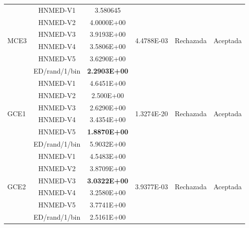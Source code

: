 \begin{table}
{\begin{tabular}{lccccc}
			\multirow{6}{*}{MCE3} & HNMED-V1      &  3.580645        & \multirow{6}{*}{4.4788E-03}  & \multirow{6}{*}{Rechazada}& \multirow{6}{*}{Aceptada} \\
			& HNMED-V2      & 4.0000E+00        &                    &                          &                            \\
			& HNMED-V3      & 3.9193E+00         &                    &                          &                            \\
			& HNMED-V4      & 3.5806E+00         &                    &                          &                            \\
			& HNMED-V5      &  3.6290E+00         &                    &                          &                            \\
			& ED/rand/1/bin & \textbf{2.2903E+00}    &                    &                          &                            \\
			
			
			
			\hline  
			\multirow{6}{*}{GCE1} & HNMED-V1      &   4.6451E+00       & \multirow{6}{*}{1.3274E-20}  & \multirow{6}{*}{Rechazada}& \multirow{6}{*}{Aceptada} \\
			& HNMED-V2      &   2.500E+00       &                    &                          &                            \\
			& HNMED-V3      &   2.6290E+00       &                    &                          &                            \\
			& HNMED-V4      &   3.4354E+00       &                    &                          &                            \\
			& HNMED-V5      &\textbf{1.8870E+00} &                    &                          &                            \\
			& ED/rand/1/bin &   5.9032E+00       &                    &                          &                            \\
			\hline  
			
			\multirow{6}{*}{GCE2} & HNMED-V1      &  4.5483E+00        & \multirow{6}{*}{3.9377E-03}  & \multirow{6}{*}{Rechazada}& \multirow{6}{*}{Aceptada} \\
			& HNMED-V2      &  3.8709E+00        &                    &                          &                            \\
			& HNMED-V3      & \textbf{ 3.0322E+00}                    &                          &                          &  \\
			& HNMED-V4      &  3.2580E+00         &                    &                          &                            \\
			& HNMED-V5      & 3.7741E+00          &                    &                          &                            \\
			& ED/rand/1/bin & 2.5161E+00&        &                     &                            \\
			\hline 
			

\end{tabular}}
\end{table}

